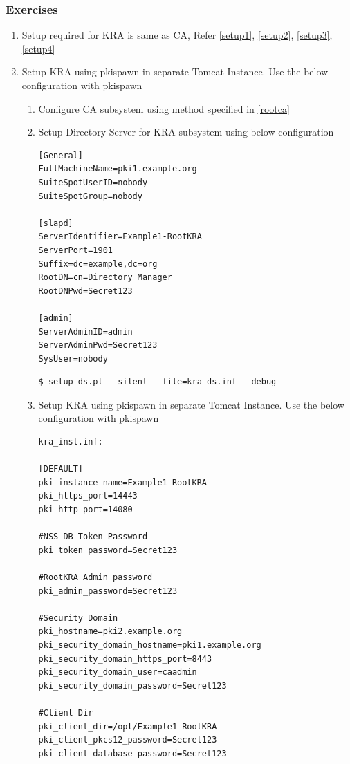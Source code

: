 \documentclass[a4paper]{article}
\begin{document}
\subsubsection{Exercises}
    \begin{enumerate}[label*=\arabic*.]
        \item Setup required for KRA is same as CA, Refer \ref{setup1}, \ref{setup2}, \ref{setup3}, \ref{setup4}
        \item Setup KRA using pkispawn in separate Tomcat Instance. Use the below configuration with pkispawn
            \begin{enumerate}[label*=\arabic*.]
                \item Configure CA subsystem using method specified in \ref{rootca}
                \item Setup Directory Server for KRA subsystem  using below configuration
                    \begin{lstlisting}
[General]
FullMachineName=pki1.example.org
SuiteSpotUserID=nobody
SuiteSpotGroup=nobody

[slapd]
ServerIdentifier=Example1-RootKRA
ServerPort=1901
Suffix=dc=example,dc=org
RootDN=cn=Directory Manager
RootDNPwd=Secret123

[admin]
ServerAdminID=admin
ServerAdminPwd=Secret123
SysUser=nobody
                    \end{lstlisting}
                    \begin{lstlisting}[style=bashInputStyle]
$ setup-ds.pl --silent --file=kra-ds.inf --debug            
                    \end{lstlisting}
                \item \label{kra_sep_tomcat} Setup KRA using pkispawn in separate Tomcat Instance. Use the below configuration with pkispawn
                    \begin{lstlisting}
kra_inst.inf:

[DEFAULT]
pki_instance_name=Example1-RootKRA
pki_https_port=14443
pki_http_port=14080

#NSS DB Token Password
pki_token_password=Secret123

#RootKRA Admin password
pki_admin_password=Secret123

#Security Domain
pki_hostname=pki2.example.org
pki_security_domain_hostname=pki1.example.org
pki_security_domain_https_port=8443
pki_security_domain_user=caadmin
pki_security_domain_password=Secret123

#Client Dir
pki_client_dir=/opt/Example1-RootKRA
pki_client_pkcs12_password=Secret123
pki_client_database_password=Secret123


\end{lstlisting}
\end{enumerate}
\end{enumerate}
\end{document}
